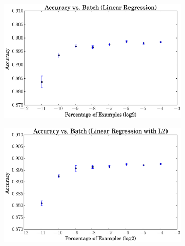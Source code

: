\documentclass[a4paper, 12pt]{article}
\begin{document}
\begin{figure}[htpb]
    \centering
    \begin{subfigure}[htpb]{0.45\textwidth}
        \includegraphics[width=\textwidth]{acc_vs_batchp_linreg}
        \caption{}
        \label{fig:batch_linreg}
    \end{subfigure}
    \begin{subfigure}[htpb]{0.45\textwidth}
        \includegraphics[width=\textwidth]{acc_vs_batchp_linregL2}
        \caption{}
        \label{fig:batch_linregL2}
    \end{subfigure}
    \hfill %
    \begin{subfigure}[htpb]{0.45\textwidth}

\end{subfigure}
\end{figure}
\end{document}
